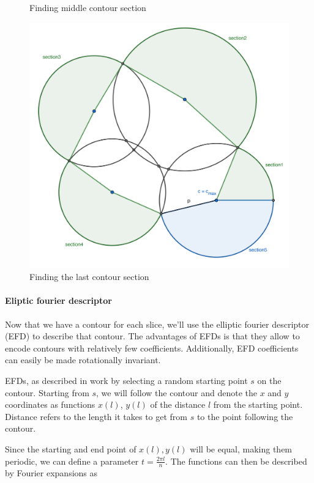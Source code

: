 \begin{figure}[!htb]
    \caption{Finding middle contour section}\label{fig:contour2}
  \endminipage\hfill
    \includegraphics[width=1.0\textwidth]{figures/contour/c3copy.pdf}
    \caption{Finding the last contour section}\label{fig:contour3}
  \endminipage
\end{figure}


\paragraph{Eliptic fourier descriptor}

Now that we have a contour for each slice, we'll use the elliptic fourier descriptor (EFD) to describe that contour.
The advantages of EFDs is that they allow to encode contours with relatively few coefficients. 
Additionally, EFD coefficients can easily be made rotationally invariant.

EFDs, as described in \cite{LIN1987535} work by selecting a random starting point $s$ on the contour.
Starting from $s$, we will follow the contour and denote the $x$ and $y$ coordinates as functions $x(l)$, $y(l)$ of the distance $l$ from the starting point.
Distance refers to the length it takes to get from $s$ to the point following the contour.

Since the starting and end point of $x(l), y(l)$ will be equal, making them periodic, we can define a parameter $t=\frac{2\pi l}{n}$.
The functions can then be described by Fourier expansions as


